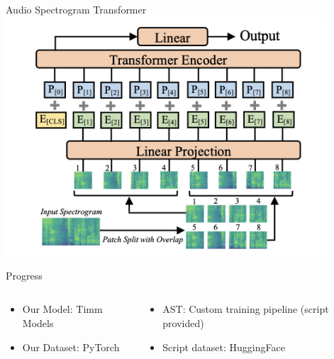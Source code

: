 
\begin{frame}{Audio Spectrogram Transformer}
    \centering
    \includegraphics[height=0.7\textheight,width=0.9\textwidth,keepaspectratio]{images/ast.png}
\end{frame}

\begin{frame}{Progress}
    \centering
    \begin{columns}
            \begin{column}{0.5\textwidth}
                \begin{itemize}
                    \item Our Model: Timm Models
                    \item Our Dataset: PyTorch
                \end{itemize}
            \end{column}
            \begin{column}{0.5\textwidth}
                \begin{itemize}
                    \item AST: Custom training pipeline (script provided)
                    \item Script dataset: HuggingFace
                \end{itemize}
            \end{column}
    \end{columns}
\end{frame}

